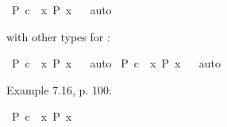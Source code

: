 \begin{isabellebody}
\ {\isachardoublequoteopen}{\isasymlfloor}\isactrlbold {\isasymbox}{\isacharparenleft}P\ {\isacharparenleft}c{\isacharcolon}{\isacharcolon}{\isasymup}{\isasymzero}{\isacharparenright}{\isacharparenright}\ \isactrlbold {\isasymrightarrow}\ {\isacharparenleft}\isactrlbold {\isasymexists}x{\isacharcolon}{\isacharcolon}{\isasymup}{\isasymzero}{\isachardot}\ \isactrlbold {\isasymbox}{\isacharparenleft}P\ x{\isacharparenright}{\isacharparenright}{\isasymrfloor}{\isachardoublequoteclose}%
\ %
%
\isamarkupfalse%
\ auto%
%
%
%
\begin{isamarkuptext}%
with other types for :%
\end{isamarkuptext}\isamarkuptrue%
\isamarkupfalse%
\ {\isachardoublequoteopen}{\isasymlfloor}\isactrlbold {\isasymbox}{\isacharparenleft}P\ {\isacharparenleft}c{\isacharcolon}{\isacharcolon}{\isasymzero}{\isacharparenright}{\isacharparenright}\ \isactrlbold {\isasymrightarrow}\ {\isacharparenleft}\isactrlbold {\isasymexists}x{\isacharcolon}{\isacharcolon}{\isasymzero}{\isachardot}\ \isactrlbold {\isasymbox}{\isacharparenleft}P\ x{\isacharparenright}{\isacharparenright}{\isasymrfloor}{\isachardoublequoteclose}%
\ %
%
\isamarkupfalse%
\ auto%
%
%
\isanewline
{}\isamarkupfalse%
\ {\isachardoublequoteopen}{\isasymlfloor}\isactrlbold {\isasymbox}{\isacharparenleft}P\ {\isacharparenleft}c{\isacharcolon}{\isacharcolon}{\isasymlangle}{\isasymzero}{\isasymrangle}{\isacharparenright}{\isacharparenright}\ \isactrlbold {\isasymrightarrow}\ {\isacharparenleft}\isactrlbold {\isasymexists}x{\isacharcolon}{\isacharcolon}{\isasymlangle}{\isasymzero}{\isasymrangle}{\isachardot}\ \isactrlbold {\isasymbox}{\isacharparenleft}P\ x{\isacharparenright}{\isacharparenright}{\isasymrfloor}{\isachardoublequoteclose}%
\ %
%
\isamarkupfalse%
\ auto%
%
%
%
\begin{isamarkuptext}%
Example 7.16, p. 100:%
\end{isamarkuptext}\isamarkuptrue%
\isamarkupfalse%
\ {\isachardoublequoteopen}{\isasymlfloor}\isactrlbold {\isasymbox}{\isacharparenleft}P\ {\isasymdownharpoonleft}{\isacharparenleft}c{\isacharcolon}{\isacharcolon}{\isasymup}{\isasymzero}{\isacharparenright}{\isacharparenright}\ \isactrlbold {\isasymrightarrow}\ {\isacharparenleft}\isactrlbold {\isasymexists}x{\isacharcolon}{\isacharcolon}{\isasymzero}{\isachardot}\ \isactrlbold {\isasymbox}{\isacharparenleft}P\ x{\isacharparenright}{\isacharparenright}{\isasymrfloor}{\isachardoublequoteclose}\ \isanewline
\ \ \isamarkupfalse%

\end{isabellebody}
